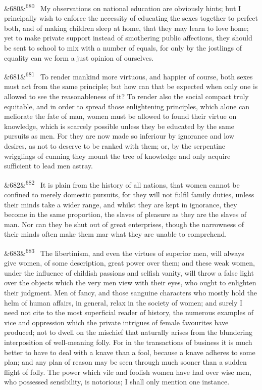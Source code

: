 \documentclass[12pt]{article}
\newcommand{\para}[1][]{\par\noindent\ifx&#1&\else\textsuperscript{\footnotesize #1}~\fi}
\begin{document}
\para[680] My observations on national education are obviously hints; but I principally wish to enforce the necessity of educating the sexes together to perfect both, and of making children sleep at home, that they may learn to love home; yet to make private support instead of smothering public affections, they should be sent to school to mix with a number of equals, for only by the jostlings of equality can we form a just opinion of ourselves.

\para[681] To render mankind more virtuous, and happier of course, both sexes must act from the same principle; but how can that be expected when only one is allowed to see the reasonableness of it? To render also the social compact truly equitable, and in order to spread those enlightening principles, which alone can meliorate the fate of man, women must be allowed to found their virtue on knowledge, which is scarcely possible unless they be educated by the same pursuits as men. For they are now made so inferiour by ignorance and low desires, as not to deserve to be ranked with them; or, by the serpentine wrigglings of cunning they mount the tree of knowledge and only acquire sufficient to lead men astray.

\para[682] It is plain from the history of all nations, that women cannot be confined to merely domestic pursuits, for they will not fulfil family duties, unless their minds take a wider range, and whilst they are kept in ignorance, they become in the same proportion, the slaves of pleasure as they are the slaves of man. Nor can they be shut out of great enterprises, though the narrowness of their minds often make them mar what they are unable to comprehend.

\para[683] The libertinism, and even the virtues of superior men, will always give women, of some description, great power over them; and these weak women, under the influence of childish passions and selfish vanity, will throw a false light over the objects which the very men view with their eyes, who ought to enlighten their judgment. Men of fancy, and those sanguine characters who mostly hold the helm of human affairs, in general, relax in the society of women; and surely I need not cite to the most superficial reader of history, the numerous examples of vice and oppression which the private intrigues of female favourites have produced; not to dwell on the mischief that naturally arises from the blundering interposition of well-meaning folly. For in the transactions of business it is much better to have to deal with a knave than a fool, because a knave adheres to some plan; and any plan of reason may be seen through much sooner than a sudden flight of folly. The power which vile and foolish women have had over wise men, who possessed sensibility, is notorious; I shall only mention one instance.
\end{document}
